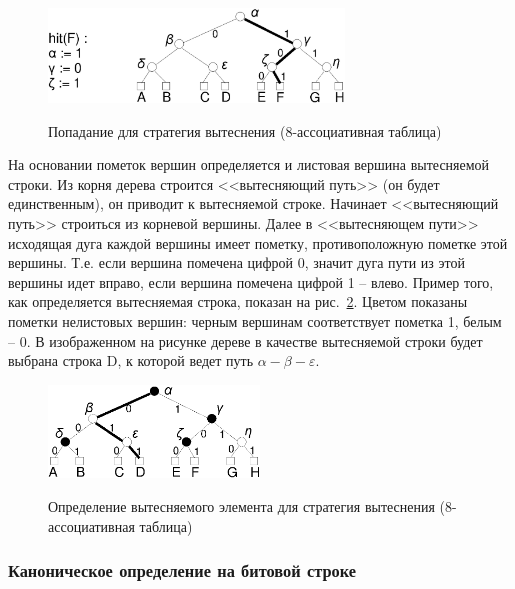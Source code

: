 \begin{figure}[h] \center
  \includegraphics[width=0.7\textwidth]{2.theor/plruhit}\\
  \caption{Попадание для стратегия вытеснения \PseudoLRU
  (8-ассоциативная таблица)}\label{pseudo_lru_hit}
\end{figure}

На основании пометок вершин определяется и листовая вершина вытесняемой строки.
Из корня дерева строится <<вытесняющий путь>> (он будет единственным), он приводит к вытесняемой строке. Начинает <<вытесняющий путь>> строиться из корневой вершины. Далее в <<вытесняющем пути>> исходящая дуга каждой вершины имеет пометку, противоположную пометке этой вершины. Т.е. если вершина помечена цифрой 0, значит дуга пути из этой вершины идет вправо, если вершина помечена цифрой 1 -- влево. Пример того, как определяется вытесняемая строка, показан на рис.~\ref{pseudo_lru_miss}. Цветом показаны пометки нелистовых вершин: черным
вершинам соответствует пометка 1, белым -- 0. В изображенном на рисунке дереве в качестве вытесняемой строки будет выбрана строка D, к которой ведет путь $\alpha-\beta-\varepsilon$.

\begin{figure}[h] \center
  \includegraphics[width=0.5\textwidth]{2.theor/plrumiss}\\
  \caption{Определение вытесняемого элемента для стратегия вытеснения
  \PseudoLRU (8-ассоциативная таблица)}\label{pseudo_lru_miss}
\end{figure}


\subsubsection{Каноническое определение \PseudoLRU на битовой строке}

